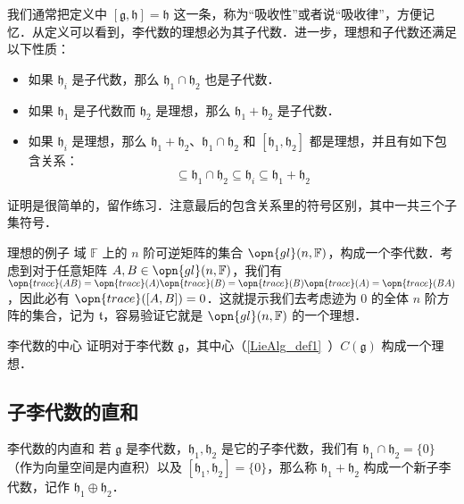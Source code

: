 我们通常把定义中 $[\mathfrak{g}, \mathfrak{h}]=\mathfrak{h}$ 这一条，称为“吸收性”或者说“吸收律”，方便记忆．从定义可以看到，李代数的理想必为其子代数．进一步，理想和子代数还满足以下性质：

\begin{itemize}
\item 如果 $\mathfrak{h}_i$ 是子代数，那么 $\mathfrak{h}_1\cap\mathfrak{h}_2$ 也是子代数．
\item 如果 $\mathfrak{h}_1$ 是子代数而 $\mathfrak{h}_2$ 是理想，那么 $\mathfrak{h}_1+\mathfrak{h}_2$ 是子代数．
\item 如果 $\mathfrak{h}_i$ 是理想，那么 $\mathfrak{h}_1+\mathfrak{h}_2$、$\mathfrak{h}_1\cap\mathfrak{h}_2$ 和 $[\mathfrak{h}_1, \mathfrak{h}_2]$ 都是理想，并且有如下包含关系：\begin{equation}
[\mathfrak{h}_1, \mathfrak{h}_2]\subseteq\mathfrak{h}_1\cap\mathfrak{h}_2\subseteq\mathfrak{h}_i\subseteq\mathfrak{h}_1+\mathfrak{h}_2
\end{equation}

\end{itemize}

证明是很简单的，留作练习．注意最后的包含关系里的符号区别，其中一共三个子集符号．

\begin{example}{理想的例子}
域 $\mathbb{F}$ 上的 $n$ 阶可逆矩阵的集合 $\opn{gl}(n, \mathbb{F})$，构成一个李代数．考虑到对于任意矩阵 $A, B\in\opn{gl}(n, \mathbb{F})$，我们有 $\opn{trace}(AB)=\opn{trace}(A)\opn{trace}(B)=\opn{trace}(B)\opn{trace}(A)=\opn{trace}(BA)$，因此必有 $\opn{trace}([A, B])=0$．这就提示我们去考虑迹为 $0$ 的全体 $n$ 阶方阵的集合，记为 $\mathfrak{t}$，容易验证它就是 $\opn{gl}(n, \mathbb{F})$ 的一个理想．
\end{example}

\begin{exercise}{李代数的中心}
证明对于李代数 $\mathfrak{g}$，其中心（\autoref{LieAlg_def1}~）$C(\mathfrak{g})$ 构成一个理想．
\end{exercise}


\subsection{子李代数的直和}



\begin{definition}{李代数的内直和}
若 $\mathfrak{g}$ 是李代数，$\mathfrak{h}_1, \mathfrak{h}_2$ 是它的子李代数，我们有 $\mathfrak{h}_1 \cap \mathfrak{h}_2 = \{0\}$（作为向量空间是内直积）以及 $[\mathfrak{h}_1, \mathfrak{h}_2] = \{0\}$，那么称 $\mathfrak{h}_1 + \mathfrak{h}_2$ 构成一个新子李代数，记作 $\mathfrak{h}_1 \oplus \mathfrak{h}_2$．
\end{definition}

